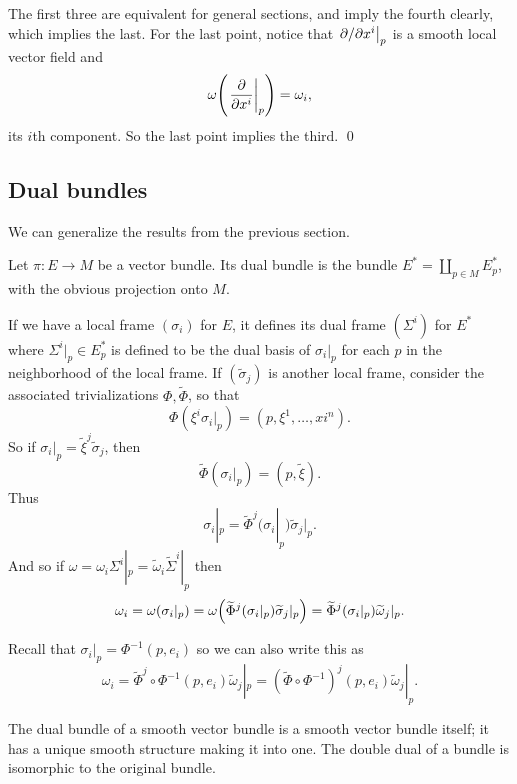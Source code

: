 \eprop

\bproof

    The first three are equivalent for general sections, and imply the fourth clearly, which implies the last.
    For the last point, notice that $\left.\partial /\partial x^i\right|_p$ is a smooth local vector field and
    $$ \omega\mathopen{}\mathclose{\left(\left.{{\partial }\over{\partial x^i}}\right|_p\right)} = \omega_i, $$
    its $i$th component.
    So the last point implies the third.
    \qed

\eproof

\subsection{Dual bundles}

We can generalize the results from the previous section.

\bdefn

    Let $\pi\colon E\to M$ be a vector bundle.
    Its {\emphcolor dual bundle} is the bundle $E^*=\coprod_{p\in M}E_p^*$, with the obvious projection onto $M$.

\edefn

If we have a local frame $(\sigma_i)$ for $E$, it defines its {\emphcolor dual frame} $(\Sigma^i)$ for $E^*$ where $\Sigma^i|_p\in E_p^*$ is defined to be the
dual basis of $\sigma_i|_p$ for each $p$ in the neighborhood of the local frame.
If $(\tilde\sigma_j)$ is another local frame, consider the associated trivializations $\Phi,\tilde\Phi$, so that
$$ \Phi(\xi^i\sigma_i|_p) = (p,\xi^1,\dots,xi^n) . $$
So if $\sigma_i|_p=\tilde\xi^j\tilde\sigma_j$, then
$$ \tilde\Phi(\sigma_i|_p) = (p,\tilde\xi) . $$
Thus
$$ \sigma_i|_p = \tilde\Phi^j(\sigma_i|_p)\tilde\sigma_j|_p . $$
And so if $\omega=\omega_i\Sigma^i|_p=\tilde\omega_i\tilde\Sigma^i|_p$ then
$$ \omega_i = \omega(\sigma_i|_p) = \omega\mathopen{}\mathclose{\left(\widetilde\Phi^j(\sigma_i|_p)\widetilde\sigma_j|_p\right)} = \widetilde\Phi^j(\sigma_i|_p)\widetilde\omega_j|_p . $$

Recall that $\sigma_i|_p=\Phi^{-1}(p,e_i)$ so we can also write this as
$$ \omega_i = \tilde\Phi^j\circ\Phi^{-1}(p,e_i)\tilde\omega_j|_p = (\tilde\Phi\circ\Phi^{-1})^j(p,e_i)\tilde\omega_j|_p . $$

\bprop

    The dual bundle of a smooth vector bundle is a smooth vector bundle itself; it has a unique smooth structure making it into one.
    The double dual of a bundle is isomorphic to the original bundle.

\eprop

\bproof

